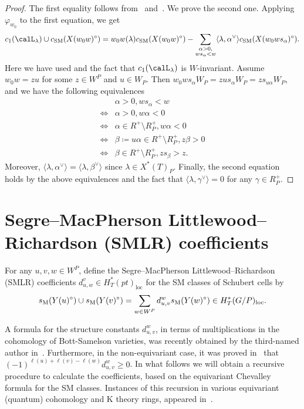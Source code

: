\documentclass[11pt]{article}
\theoremstyle{definition}
\numberwithin{equation}{section}
\newcommand{\csm}{c_{\mathrm{SM}}}
\newcommand{\ssm}{s_{\mathrm{M}}}
\DeclareMathOperator{\loc}{loc}
\begin{document}
\begin{proof}
	The first equality follows from~\cite[Theorem 3.7]{su:quantum} and~\cite{AMSS:shadows}. We prove the second one. Applying $\varphi_{w_0}$ to the first equation, we get
	\[c_1(\calL_\lambda)\cup \csm (X(w_0w)^\circ)=w_0w(\lambda) \csm (X(w_0w)^\circ)-\sum_{\substack{\alpha>0,\\ws_\alpha <w}}\langle\lambda,\alpha^\vee\rangle \csm (X(w_0ws_\alpha)^\circ).\]
	Here we have used  and the fact that $c_1(\calL_\lambda)$ is $W$-invariant. 
	Assume $w_0w=zu$ for some $z\in W^P$ and $u\in W_P$. Then $w_0ws_\alpha W_P=zus_\alpha W_P=zs_{u\alpha}W_P$, and we have the following equivalences
	\begin{align*}
		&\alpha>0, ws_\alpha <w\\
		\Leftrightarrow&\alpha>0, w\alpha<0\\
		\Leftrightarrow&\alpha\in R^+\setminus R^+_P, w\alpha<0\\
		\Leftrightarrow&\beta\coloneqq u\alpha\in R^+\setminus R^+_P, z\beta>0\\
		\Leftrightarrow&\beta\in R^+\setminus R^+_P, zs_\beta>z.
	\end{align*}
	Moreover, $\langle\lambda,\alpha^\vee\rangle=\langle\lambda,\beta^\vee\rangle$ since $\lambda\in X^*(T)_P$.
	Finally, the second equation holds by the above equivalences and the fact that $\langle\lambda,\gamma^\vee\rangle=0$ for any $\gamma\in R^+_P$.
\end{proof}

\section{Segre--MacPherson Littlewood--Richardson (SMLR) coefficients}
For any $u,v,w\in W^P$, define the Segre--MacPherson Littlewood--Richardson (SMLR) coefficients 
$d_{u,w}^{v} {\in H^*_T(pt)_{\loc}}$ for the SM classes of Schubert cells by
\begin{equation}\label{equ:CSMLR}
	\ssm({Y(u)^\circ}) \cup \ssm({Y(v)^\circ}) =\sum_{w\in W^P} d_{u,v}^{w}\ssm({Y(w)^\circ})\in {
		H_T^*(G/P)_{\loc}} \/.
\end{equation}

A formula for the structure constants $d_{u,v}^{w}$, in terms of multiplications in the cohomology
of Bott-Samelson varieties, 
was recently obtained by the third-named author in~\cite[Theorem 5.2]{su:structure}. 
Furthermore, in the non-equivariant case, it was proved in~\cite{schurmann.simpson.wang} 
that $(-1)^{\ell(u)+\ell(v)-\ell(w)}d_{u,v}^w \ge 0$.
In what follows we will obtain a recursive procedure to calculate the coefficients, based on the
equivariant Chevalley formula for the SM classes. Instances of this
recursion in various equivariant (quantum) cohomology 
and K theory rings,
appeared in~\cite{molev.sagan:Littlewood-Richardson,knutson.tao:puzzles,mihalcea:eqqgr,mihalcea:eqqhom,naruse2014schubert,BCMP:QKChev,naruse2019skew}. 
\end{document}
